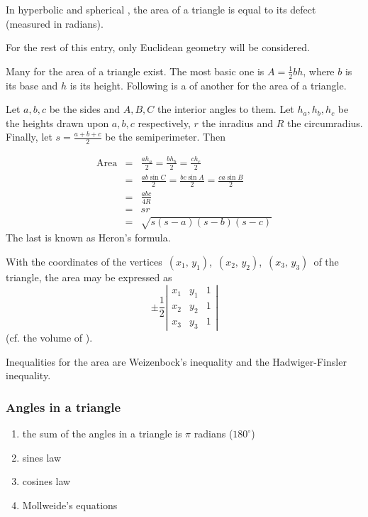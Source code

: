 \documentclass[12pt]{article}
\begin{document}
In hyperbolic and spherical , the area of a triangle is equal to its defect (measured in radians).

For the rest of this entry, only Euclidean geometry will be 
considered.

Many  for the area of a triangle exist.  The most basic one is $\displaystyle A=\frac{1}{2}bh$, where $b$ is its base and $h$ is its height.  Following is a  of another  for the area of a triangle.
 
Let $a,b,c$ be the sides and $A,B,C$ the interior angles  to them. Let $h_a,h_b,h_c $ be the heights drawn upon $a,b,c$ respectively, $r$ the inradius and $R$ the circumradius. Finally, let $\displaystyle s=\frac{a+b+c}{2}$ be the semiperimeter. Then

\begin{eqnarray*}
\text{Area} &=& \frac{a h_a}{2}=\frac{b h_b}{2}=\frac{c h_c}{2}\\
&=& \frac{ab\sin C}{2}=\frac{bc\sin A}{2}=\frac{ca\sin B}{2}\\
&=& \frac{abc}{4R}\\
&=& sr\\
&=& \sqrt{s(s-a)(s-b)(s-c)}
\end{eqnarray*}
The last  is known as Heron's formula.

With the coordinates of the vertices \,$(x_1,\,y_1)$,\, $(x_2,\,y_2)$,\, $(x_3,\,y_3)$\, of the triangle, the area may be expressed as
$$ 
\pm\frac{1}{2}\left|\begin{matrix}
x_1 & y_1 & 1\\
x_2 & y_2 & 1\\
x_3 & y_3 & 1
\end{matrix}\right|
$$
(cf. the volume of ).

Inequalities for the area are Weizenbock's inequality and the Hadwiger-Finsler inequality.

\subsubsection*{Angles in a triangle}
\begin{enumerate}
\item the sum of the angles in a triangle is $\pi$ radians ($180^\circ$)
\item sines law 
\item cosines law 
\item Mollweide's equations 
\end{enumerate}
\end{document}
